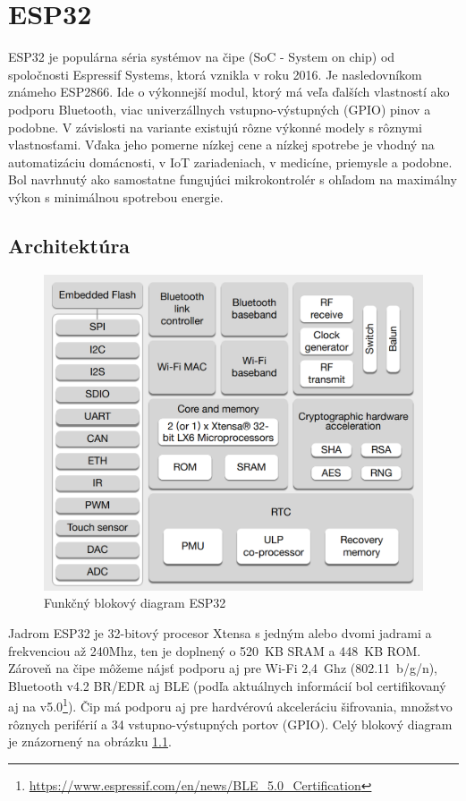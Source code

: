 \chapter{ESP32}

ESP32 je populárna séria systémov na čipe (SoC - System on chip) od spoločnosti Espressif Systems, ktorá vznikla v roku 2016. Je nasledovníkom známeho ESP2866. Ide o výkonnejší modul, ktorý má veľa ďalších vlastností ako podporu Bluetooth, viac univerzállnych vstupno-výstupných (GPIO) pinov a podobne. V závislosti na variante existujú rôzne výkonné modely s rôznymi vlastnosťami.
Vďaka jeho pomerne nízkej cene a nízkej spotrebe je vhodný na automatizáciu domácnosti, v IoT zariadeniach, v medicíne, priemysle a podobne. Bol navrhnutý ako samostatne fungujúci mikrokontrolér s ohľadom na maximálny výkon s minimálnou spotrebou energie.

\section{Architektúra}

\begin{figure}[ht]
    \centering
    \includegraphics[scale=0.3]{obrazky-figures/esp32_diagram.png}
    \caption[Funkčný blokový diagram ESP32]{Funkčný blokový diagram ESP32\cite{esp-datasheet}}
    \label{fig:esp_diagram}
\end{figure}

Jadrom ESP32 je 32-bitový procesor Xtensa s jedným alebo dvomi jadrami a frekvenciou až 240Mhz, ten je doplnený o 520~KB SRAM a 448~KB ROM. Zároveň na čipe môžeme nájsť podporu aj pre Wi-Fi 2,4~Ghz (802.11~b/g/n), Bluetooth v4.2 BR/EDR aj BLE (podľa aktuálnych informácií bol certifikovaný aj na v5.0\footnote{\url{https://www.espressif.com/en/news/BLE_5.0_Certification}}).
Čip má podporu aj pre hardvérovú akceleráciu šifrovania, množstvo rôznych periférií a 34 vstupno-výstupných portov (GPIO). Celý blokový diagram je znázornený na obrázku \ref{fig:esp_diagram}.\cite{esp-datasheet}


